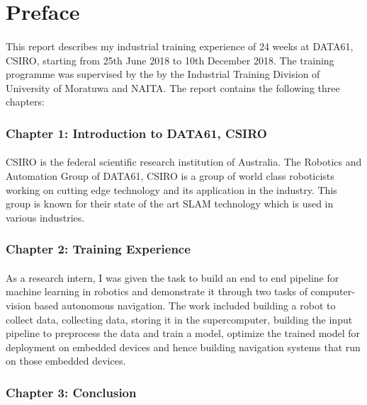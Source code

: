 \section*{Preface}

\paragraph{}
This report describes my industrial training experience of 24 weeks at DATA61, CSIRO, starting from 25th June 2018 to 10th December 2018. The training programme was supervised by the by the Industrial Training Division of University of Moratuwa and NAITA. The report contains the following three chapters:

\subsubsection*{Chapter 1: Introduction to DATA61, CSIRO}
\paragraph{}
CSIRO is the federal scientific research institution of Australia. The Robotics and Automation Group of DATA61, CSIRO is a group of world class roboticists working on cutting edge technology and its application in the industry. This group is known for their state of the art SLAM technology which is used in various industries. 

\subsubsection*{Chapter 2: Training Experience}
\paragraph{}
As a research intern, I was given the task to build an end to end pipeline for machine learning in robotics and demonstrate it through two tasks of computer-vision based autonomous navigation. The work included building a robot to collect data, collecting data, storing it in the supercomputer, building the input pipeline to preprocess the data and  train a model, optimize the trained model for deployment on embedded devices and hence building navigation systems that run on those embedded devices.

\subsubsection*{Chapter 3: Conclusion}
